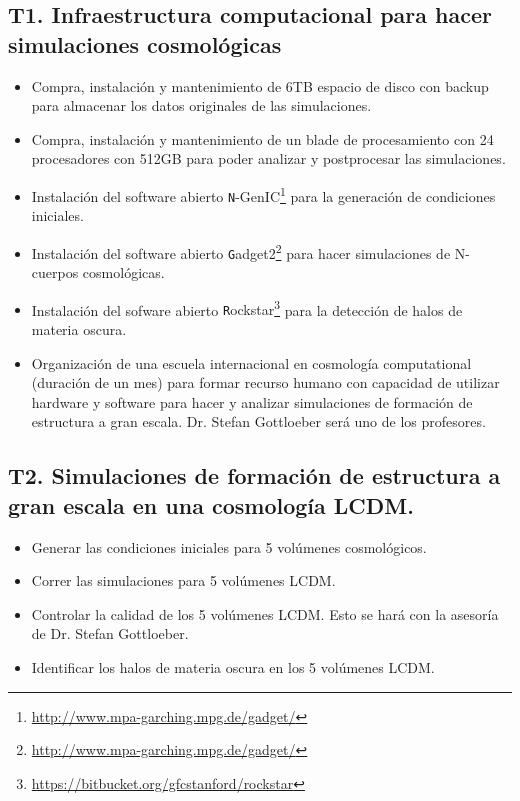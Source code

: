 \subsection*{T1. Infraestructura computacional para hacer simulaciones
  cosmol\'ogicas} 
\begin{itemize}
\item[T1.1] \tecn Compra, instalaci\'on y mantenimiento de 6TB espacio de disco
  con backup para almacenar los datos originales de las simulaciones.
\item[T1.2] \tecn Compra, instalaci\'on y mantenimiento de un blade de
  procesamiento con 24 procesadores con 512GB para poder analizar y
  postprocesar las simulaciones.
\item[T1.4] \gradA\prof Instalaci\'on del software abierto {\texttt N-GenIC}\footnote{\url{http://www.mpa-garching.mpg.de/gadget/}} para la generaci\'on de condiciones iniciales.
\item[T1.3] \gradA\prof Instalaci\'on del software abierto {\texttt
  Gadget2}\footnote{\url{http://www.mpa-garching.mpg.de/gadget/}} para hacer simulaciones de N-cuerpos cosmol\'ogicas.
\item[T1.5] \gradA\prof Instalaci\'on del sofware abierto {\texttt
  Rockstar}\footnote{\url{https://bitbucket.org/gfcstanford/rockstar}} para la detecci\'on de halos de materia oscura.
\item[T1.6] \gradA\gradB\prof Organizaci\'on de una escuela internacional en
  cosmolog\'ia computational (duraci\'on de un mes) para formar
  recurso humano con capacidad de utilizar hardware y software para
  hacer y analizar simulaciones de formaci\'on de estructura a gran
  escala. Dr. Stefan Gottloeber ser\'a uno de los profesores.
\end{itemize}

\subsection*{T2. Simulaciones de formaci\'on de estructura a gran
  escala en una cosmolog\'ia LCDM.}

\begin{itemize}
\item[T2.1] \gradA Generar las condiciones iniciales para 5 vol\'umenes
  cosmol\'ogicos. 
\item[T2.2] \gradA Correr las simulaciones para 5 vol\'umenes LCDM.
\item[T2.3] \gradA Controlar la calidad de los 5 vol\'umenes LCDM.  
Esto se har\'a con la asesor\'ia de Dr. Stefan Gottloeber.
\item[T2.4] \gradA Identificar los halos de materia oscura en los 5
  vol\'umenes LCDM.
\end{itemize}


